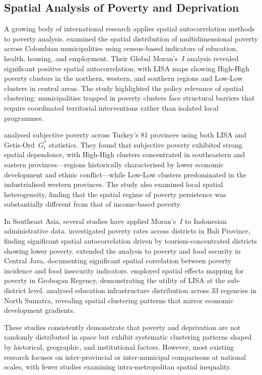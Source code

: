 \documentclass[12pt,a4paper,twoside]{article}
\begin{document}
\subsection{Spatial Analysis of Poverty and Deprivation}

A growing body of international research applies spatial autocorrelation methods to
poverty analysis. \citet{gonzalez2025pobreza} examined the spatial distribution of
multidimensional poverty across Colombian municipalities using census-based
indicators of education, health, housing, and employment. Their Global Moran's~$I$
analysis revealed significant positive spatial autocorrelation, with LISA maps
showing High-High poverty clusters in the northern, western, and southern regions
and Low-Low clusters in central areas. The study highlighted the policy relevance
of spatial clustering: municipalities trapped in poverty clusters face structural
barriers that require coordinated territorial interventions rather than isolated
local programmes.

\citet{tatli2025subjective} analysed subjective poverty across Turkey's 81 provinces
using both LISA and Getis-Ord~$G_i^*$ statistics. They found that subjective poverty
exhibited strong spatial dependence, with High-High clusters concentrated in
southeastern and eastern provinces---regions historically characterised by lower
economic development and ethnic conflict---while Low-Low clusters predominated in
the industrialised western provinces. The study also examined local spatial
heterogeneity, finding that the spatial regime of poverty persistence was
substantially different from that of income-based poverty.

In Southeast Asia, several studies have applied Moran's~$I$ to Indonesian
administrative data. \citet{lestari2023bali} investigated poverty rates across
districts in Bali Province, finding significant spatial autocorrelation driven
by tourism-concentrated districts showing lower poverty. \citet{oktavilia2026mapping}
extended the analysis to poverty and food security in Central Java, documenting
significant spatial correlation between poverty incidence and food insecurity
indicators. \citet{jati2024grobogan} employed spatial effects mapping for poverty
in Grobogan Regency, demonstrating the utility of LISA at the sub-district level.
\citet{harahap2024educacion} analysed education infrastructure distribution across
33 regencies in North Sumatra, revealing spatial clustering patterns that mirror
economic development gradients.

These studies consistently demonstrate that poverty and deprivation are not randomly
distributed in space but exhibit systematic clustering patterns shaped by historical,
geographic, and institutional factors. However, most existing research focuses on
inter-provincial or inter-municipal comparisons at national scales, with fewer
studies examining intra-metropolitan spatial inequality.
\end{document}
